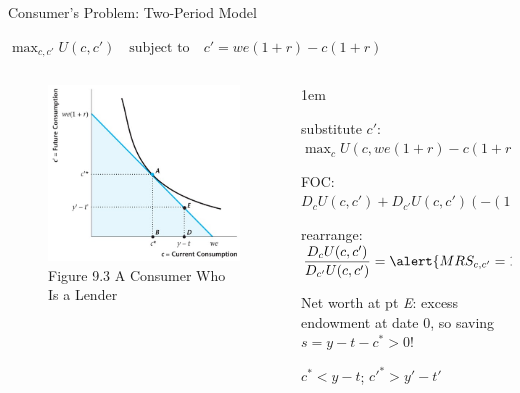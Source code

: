 \documentclass[11pt,aspectratio=43]{beamer}
\let\olditemize=\itemize
\let\endolditemize=\enditemize
\renewenvironment{itemize}{\olditemize \itemsep1em}{\endolditemize}
\theoremstyle{definition}
\begin{document}
\begin{frame}{Consumer's Problem: Two-Period Model}
\label{slide:Consumer_s_Problem__Two_Period_Model}
    \begin{center}
        $\displaystyle \max_{c, c'} U( c, c' ) \quad \text{subject to} \quad c' = we( 1+r ) - c( 1+r )$
    \end{center}
    \begin{columns}
        \begin{column}{0.4\textwidth}
            \begin{figure}
                \caption{\scriptsize Figure 9.3 A Consumer Who Is a Lender}
                \includegraphics[width=\textwidth]{./figures/Figure9_3.jpg}
            \end{figure}
        \end{column}
        \begin{column}{0.6\textwidth}
            \begin{itemize}
                \item substitute $ c' $: $ \displaystyle \max_{c} U( c, we( 1+r ) - c( 1+r ) ) $
                \item FOC: $ \displaystyle D_{c} U( c, c' ) + D_{c'} U( c, c' ) ( -( 1+r ) ) = 0 $
                \item rearrange: $ \displaystyle \frac{D_{c}U( c, c' )}{D_{c'}U( c, c' )} = \alert{MRS_{c, c'} = 1+r} $
                \item Net worth at pt \textit{E}: excess  endowment at date 0, so saving $ s = y - t - c^{*} > 0 $!
                \item $ c^{*} < y - t $; $ c'^{*} > y' - t'$
            \end{itemize}
        \end{column}
    \end{columns}
\end{frame}
\end{document}
